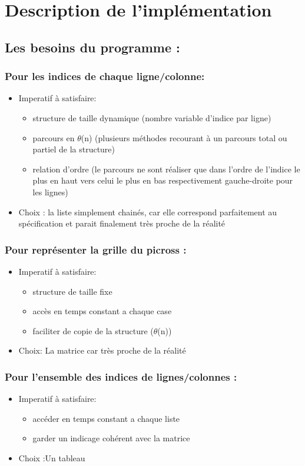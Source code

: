 \documentclass{article}
\begin{document}
\section{Description de l'impl\'ementation}
\subsection{ Les besoins du programme :}

\subsubsection{Pour les indices de chaque ligne/colonne:}
\begin{itemize}
\item Imperatif \`a satisfaire:
\begin{itemize}

\item structure de taille dynamique (nombre variable d'indice par ligne)
\item parcours en $\theta$(n) (plusieurs m\'ethodes recourant \`a  un parcours total ou partiel de la structure)
\item relation d'ordre (le parcours ne sont r\'ealiser que dans l'ordre de l'indice le plus en haut vers celui le plus en bas respectivement gauche-droite pour les
lignes)
\end{itemize}
\item Choix : la liste simplement chain\'es, car elle correspond parfaitement au sp\'ecification et parait finalement tr\`es proche de la r\'ealit\'e
\end{itemize}
\subsubsection{Pour repr\'esenter la grille du picross :}
\begin{itemize}
\item Imperatif \`a satisfaire:
\begin{itemize}
\item structure de taille fixe
\item acc\`es en temps constant a chaque case
\item faciliter de copie de la structure ($\theta$(n))
\end{itemize}
\item Choix: La matrice car tr\`es proche de la r\'ealit\'e
\end{itemize}
\subsubsection{Pour l'ensemble des indices de lignes/colonnes :}
\begin{itemize}
\item Imperatif \`a satisfaire:
\begin{itemize}
\item acc\'eder en temps constant a chaque liste
\item garder un indicage coh\'erent avec la matrice
\end{itemize}
\item Choix :Un tableau
\end{itemize}
\end{document}
